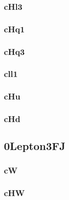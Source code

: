 \documentclass[landscape, 12pt,letterpaper]{article}
\begin{document}
\newpage

\subsubsection{cHl3}


\newpage

\subsubsection{cHq1}


\newpage

\subsubsection{cHq3}


\newpage

\subsubsection{cll1}


\newpage

\subsubsection{cHu}


\newpage

\subsubsection{cHd}


\newpage

\newpage

\subsection{0Lepton3FJ }
\subsubsection{cW}


\newpage

\subsubsection{cHW}

\end{document}
